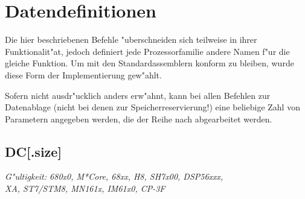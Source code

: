 \documentclass[12pt,a4paper,twoside]{report}
\makeatletter
\newcommand{\ttindex}[1]{\index{#1@{\tt #1}}}
\makeatother
\begin{document}

\section{Datendefinitionen}

Die hier beschriebenen Befehle "uberschneiden sich teilweise in ihrer
Funktionalit"at, jedoch definiert jede Prozessorfamilie andere Namen
f"ur die gleiche Funktion.  Um mit den Standardassemblern konform zu
bleiben, wurde diese Form der Implementierung gew"ahlt.

Sofern nicht ausdr"ucklich anders erw"ahnt, kann bei allen Befehlen zur
Datenablage (nicht bei denen zur Speicherreservierung!) eine beliebige Zahl
von Parametern angegeben werden, die der Reihe nach abgearbeitet werden.


\subsection{DC[.size]}
\ttindex{DC}

{\em G"ultigkeit: 680x0, M*Core, 68xx, H8, SH7x00, DSP56xxx,\\
     XA, ST7/STM8, MN161x, IM61x0, CP-3F}
\end{document}
